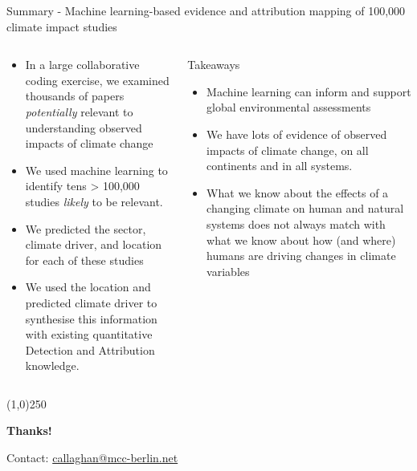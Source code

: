 \documentclass[9pt]{beamer}
\begin{document}
\begin{frame}{Summary - Machine learning-based evidence and attribution mapping of 100,000 climate impact studies}

\begin{columns}
	\small
	\begin{column}{0.5\linewidth}
		\begin{itemize}
			\item In a large collaborative coding exercise, we examined thousands of papers \textit{potentially} relevant to understanding observed impacts of climate change
			\item We used machine learning to identify tens > 100,000 studies \textit{likely} to be relevant.
			\item We predicted the sector, climate driver, and location for each of these studies
			\item We used the location and predicted climate driver to synthesise this information with existing quantitative Detection and Attribution knowledge.
		\end{itemize}
	\end{column}

	\begin{column}{0.5\linewidth}
		
		\begin{block}{Takeaways}
			\begin{itemize}
				\item Machine learning can inform and support global environmental assessments
				\item We have lots of evidence of observed impacts of climate change, on all continents and in all systems.
				\item What we know about the effects of a changing climate on human and natural systems does not always match with what we know about how (and where) humans are driving changes in climate variables 
			\end{itemize}
		\end{block}
		
	\end{column}
\end{columns}



\begin{center}
	\line(1,0){250}
	
	\medskip
	
	\textbf{Thanks!}
	
	\medskip
	
	Contact: \url{callaghan@mcc-berlin.net}

\end{center}



\end{frame}
\end{document}
